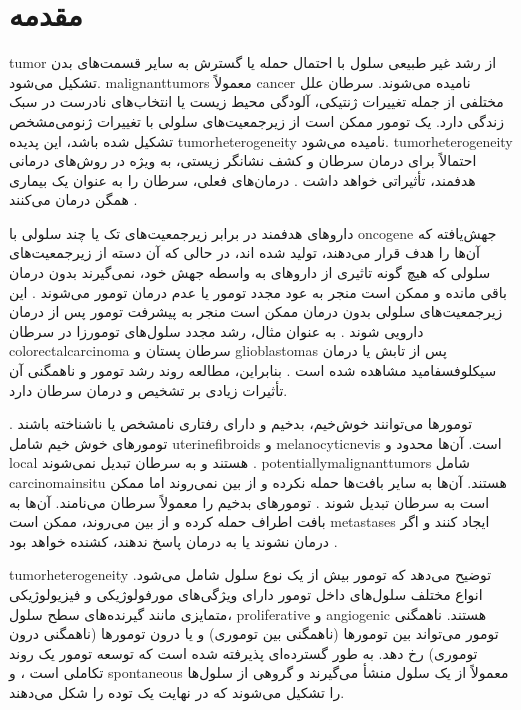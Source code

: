 
\chapter{مقدمه}

\gls{tumor}
از رشد غیر طبیعی سلول با احتمال حمله یا گسترش به سایر قسمت‌های بدن تشکیل می‌شود. \glspl{malignanttumor} معمولاً \gls{cancer} نامیده می‌شوند. سرطان علل مختلفی از جمله تغییرات ژنتیکی، آلودگی محیط زیست یا انتخاب‌های نادرست در سبک زندگی دارد. یک تومور ممکن است از زیرجمعیت‌های سلولی با تغییرات ژنومی‌مشخص تشکیل شده باشد، این پدیده \gls{tumorheterogeneity} نامیده می‌شود. \gls{tumorheterogeneity} احتمالاً برای درمان سرطان و کشف نشانگر زیستی، به ویژه در روش‌های درمانی هدفمند، تأثیراتی خواهد داشت 
\cite{fisher2013cancer}.
درمان‌های فعلی، سرطان را به عنوان یک بیماری همگن درمان می‌کنند
\cite{sun2015intra}.

دارو‌های هدفمند در برابر زیرجمعیت‌های تک یا چند سلولی با \gls{oncogene} جهش‌یافته که آن‌ها را هدف قرار می‌دهند، تولید شده اند، در حالی که آن دسته از زیرجمعیت‌های سلولی که هیچ گونه تاثیری از دارو‌های به واسطه جهش خود، نمی‌گیرند بدون درمان باقی مانده و ممکن است منجر به عود مجدد تومور یا عدم درمان تومور می‌شوند \cite{fisher2013cancer}. این زیرجمعیت‌های سلولی بدون درمان ممکن است منجر به پیشرفت تومور پس از درمان دارویی شوند \cite{fisher2013cancer}. به عنوان مثال، رشد مجدد سلول‌های تومورزا در سرطان \gls{colorectalcarcinoma} سرطان پستان و \gls{glioblastomas} پس از تابش یا درمان سیکلوفسفامید مشاهده شده است \cite{sun2015intra}. بنابراین، مطالعه روند رشد تومور و ناهمگنی آن تأثیرات زیادی بر تشخیص و درمان سرطان دارد. 


تومور‌ها می‌توانند خوش‌خیم، بدخیم و دارای رفتاری نامشخص یا ناشناخته باشند \cite{neoplasms}. تومور‌های خوش خیم شامل \glspl{uterinefibroid} و \glspl{melanocyticnevi} است. آن‌ها محدود و \gls{local} هستند و به سرطان تبدیل نمی‌شوند \cite{neoplasia}. \glspl{potentiallymalignanttumor} شامل \gls{carcinomainsitu} هستند. آن‌ها به سایر بافت‌ها حمله نکرده و از بین نمی‌روند اما ممکن است به سرطان تبدیل شوند \cite{canceractivity1}. تومور‌های بدخیم را معمولاً سرطان می‌نامند. آن‌ها به بافت اطراف حمله کرده و از بین می‌روند، ممکن است \gls{metastases} ایجاد کنند و اگر درمان نشوند یا به درمان پاسخ ندهند، کشنده خواهد بود \cite{canceractivity1}. 

\gls{tumorheterogeneity} توضیح می‌دهد که تومور بیش از یک نوع سلول شامل می‌شود. انواع مختلف سلول‌های داخل تومور دارای ویژگی‌های مورفولوژیکی و فیزیولوژیکی متمایزی مانند گیرنده‌های سطح سلول، 
\gls{proliferative}
و 
\gls{angiogenic} هستند. ناهمگنی تومور می‌تواند بین تومور‌ها (ناهمگنی بین توموری) و یا درون تومور‌ها (ناهمگنی درون توموری) رخ دهد. به طور گسترده‌ای پذیرفته شده است که توسعه تومور یک روند تکاملی است \cite{birbrair2014type}، و \gls{spontaneous} معمولاً از یک سلول منشأ می‌گیرند و گروهی از سلول‌ها را تشکیل می‌شوند که در نهایت یک توده را شکل می‌دهند. 

